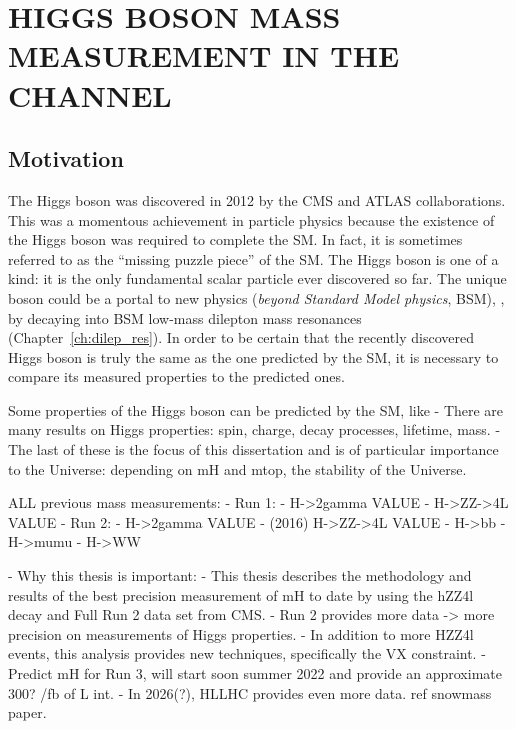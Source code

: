 \chapter{HIGGS BOSON MASS MEASUREMENT IN THE \texorpdfstring{\hzzfourl}{H to ZZ to 4l} CHANNEL}
\section{Motivation}
The Higgs boson was discovered in 2012 by the CMS and ATLAS collaborations.
This was a momentous achievement in particle physics because the existence of the Higgs boson was required to complete the SM.
In fact, it is sometimes referred to as the ``missing puzzle piece'' of the SM.
The Higgs boson is one of a kind: it is the only fundamental scalar particle ever discovered so far.
The unique boson could be a portal to new physics (\emph{beyond Standard Model physics}, BSM), \eg, by decaying into BSM low-mass dilepton mass resonances (Chapter~\ref{ch:dilep_res}).
In order to be certain that the recently discovered Higgs boson is truly the same as the one predicted by the SM, it is necessary to compare its measured properties to the predicted ones.

Some properties of the Higgs boson can be predicted by the SM, like 
    - There are many results on Higgs properties: spin, charge, decay processes, lifetime, mass.
    - The last of these is the focus of this dissertation and is of particular importance to the Universe: depending on mH and mtop, the stability of the Universe.

ALL previous mass measurements:
    - Run 1:
        - H->2gamma VALUE
        - H->ZZ->4L VALUE
    - Run 2:
        - H->2gamma VALUE
        - (2016) H->ZZ->4L VALUE
        - H->bb
        - H->mumu
        - H->WW 

- Why this thesis is important:
    - This thesis describes the methodology and results of the best precision measurement of mH to date by using the hZZ4l decay and Full Run 2 data set from CMS.
    - Run 2 provides more data -> more precision on measurements of Higgs properties.
    - In addition to more HZZ4l events, this analysis provides new techniques, specifically the VX constraint.
    - Predict mH for Run 3, will start soon summer 2022 and provide an approximate 300? /fb of L int.
    - In 2026(?), HLLHC provides even more data. ref snowmass paper.


